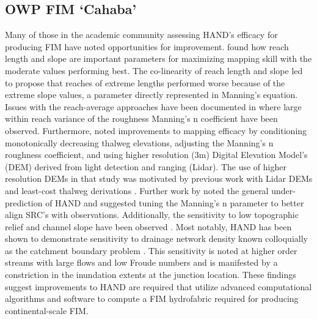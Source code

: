 \subsection{OWP FIM `Cahaba'}
%
Many of those in the academic community assessing HAND's efficacy for producing FIM have noted opportunities for improvement. 
 found how reach length and slope are important parameters for maximizing mapping skill with the moderate values performing best. 
The co-linearity of reach length and slope led  to propose that reaches of extreme lengths performed worse because of the extreme slope values, a parameter directly represented in Manning's equation. 
Issues with the reach-average approaches have been documented in  where large within reach variance of the roughness Manning's n coefficient have been observed.
Furthermore,  noted improvements to mapping efficacy by conditioning monotonically decreasing thalweg elevations, adjusting the Manning's n roughness coefficient, and using higher resolution (3m) Digital Elevation Model's (DEM) derived from light detection and ranging (Lidar).
The use of higher resolution DEMs in that study was motivated by previous work with Lidar DEMs and least-cost thalweg derivations \cite{zheng2018geoflood}.
Further work by  noted the general under-prediction of HAND and suggested tuning the Manning's n parameter to better align SRC's with observations. 
Additionally, the sensitivity to low topographic relief and channel slope have been observed \cite{johnson2019integrated,godbout2019error}. 
Most notably, HAND has been shown to demonstrate sensitivity to drainage network density known colloquially as the catchment boundary problem \cite{zhang2018comparative,mcgehee2016modified,li2020evaluation,nobre2016hand}.
This sensitivity is noted at higher order streams with large flows and low Froude numbers and is manifested by a constriction in the inundation extents at the junction location.
These findings suggest improvements to HAND are required that utilize advanced computational algorithms and software to compute a FIM hydrofabric required for producing continental-scale FIM.

